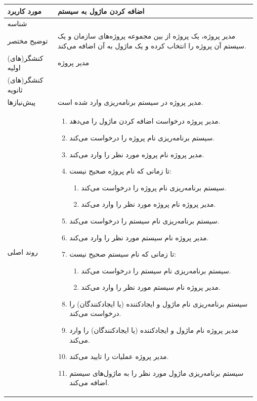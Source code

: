 \begin{table}[H]
	\centering
	\begin{tabular}{|p{3cm}|p{10cm}|}
		\hline
		
		
		مورد کاربرد	& اضافه کردن ماژول به سیستم \\
		\hline
		
		شناسه & 
		\stepcounter{usecase_ID}
		
		\arabic{usecase_ID} \\
		
		\hline
		
		توضیح مختصر & مدیر پروژه، یک پروژه از بین مجموعه پروژه‌های سازمان و یک سیستم آن پروژه را انتخاب کرده و یک ماژول به آن اضافه می‌کند. \\
		\hline
		
		کنشگر(های) اولیه& مدیر پروژه \\
		\hline
		
		کنشگر(های) ثانویه&  \\
		\hline
		
		پیش‌نیازها &
		مدیر پروژه در سیستم برنامه‌ریزی وارد شده است.\\
		\hline
		
		
		روند اصلی &
		\begin{enumerate}[topsep=0cm,leftmargin=0.5cm]
			\item  مدیر پروژه درخواست اضافه کردن ماژول را می‌دهد.
			\item سیستم برنامه‌ریزی نام پروژه را درخواست می‌کند.
			\item مدیر پروژه نام پروژه مورد نظر را وارد می‌کند. 
			\item تا زمانی که نام پروژه صحیح نیست:
			\begin{enumerate}[topsep=0cm,leftmargin=0.5cm]
				\item سیستم برنامه‌ریزی نام پروژه را درخواست می‌کند.
				\item مدیر پروژه نام پروژه‌ مورد نظر را وارد می‌کند.
			\end{enumerate}
			\item  سیستم برنامه‌ریزی نام سیستم را درخواست می‌کند.
			\item  مدیر پروژه نام سیستم مورد نظر را وارد می‌کند. 
			\item  تا زمانی که نام سیستم صحیح نیست:
			\begin{enumerate}[topsep=0cm,leftmargin=0.5cm]
				\item سیستم برنامه‌ریزی نام سیستم را درخواست می‌کند.
				\item مدیر پروژه نام سیستم مورد نظر را وارد می‌کند.
			\end{enumerate}
			\item  سیستم برنامه‌ریزی نام ماژول و ایجادکننده (یا ایجادکنندگان)  را درخواست می‌کند.
			\item مدیر پروژه نام ماژول و ایجادکننده (یا ایجادکنندگان) را وارد می‌کند.
			\item مدیر پروژه عملیات را تایید می‌کند.
			\item سیستم برنامه‌ریزی ماژول مورد نظر را به ماژول‌های سیستم اضافه می‌کند.
		\end{enumerate} \\
		\hline
		

\end{tabular}
\end{table}
